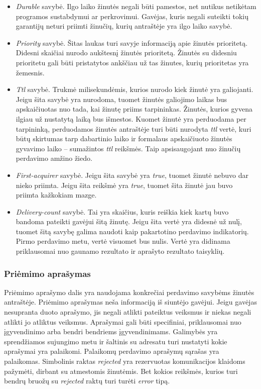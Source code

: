 \documentclass[12pt, a4paper, lithuanian]{article}
\begin{document}
        \begin{itemize}
            \item \textit{Durable} savybė. Ilgo laiko žinutės negali būti pamestos, net nutikus netikėtam programos sustabdymui ar perkrovimui.
            Gavėjas, kuris negali suteikti tokių garantijų neturi priimti žinučių, kurių antraštėje yra ilgo laiko savybė.
            \item \textit{Priority} savybė. Šitas laukas turi savyje informaciją apie žinutės prioritetą. Didesni skaičiai nurodo aukštesnį žinutės prioritetą. Žinutės su didesniu prioritetu gali būti pristatytos ankščiau už tas žinutes, kurių prioritetas yra žemesnis.
            \item \textit{Ttl} savybė. Trukmė milisekundėmis, kurios nurodo kiek žinutė yra galiojanti.
            Jeigu šita savybė yra nurodoma, tuomet žinutės galiojimo laikas bus apskaičiuotas nuo tada, kai žinutę priims tarpininkas.
            Žinutės, kurios gyvena ilgiau už nustatytą laiką bus išmestos.
            Kuomet žinutė yra perduodama per tarpininką, perduodamos žinutės antraštėje turi būti nurodyta \textit{ttl} vertė, kuri būtų skirtumas tarp dabartinio laiko ir formalaus apskaičiuoto žinutės gyvavimo laiko -- sumažintos \textit{ttl} reikšmės. Taip apsisaugojant nuo žinučių perdavimo amžino žiedo.
            \item \textit{First-acquirer} savybė. Jeigu šita savybė yra \textit{true}, tuomet žinutė nebuvo dar nieko priimta. Jeigu šita reikšmė yra \textit{true}, tuomet šita žinutė jau buvo priimta kažkokiam mazge.
            \item \textit{Delivery-count} savybė. Tai yra skaičius, kuris reiškia kiek kartų buvo bandoma pateikti gavėjui šitą žinutę. Jeigu šita vertė yra didesnė už nulį, tuomet šitą savybę galima naudoti kaip pakartotino perdavimo indikatorių. Pirmo perdavimo metu, vertė visuomet bus nulis. 
            Vertė yra didinama priklausomai nuo gaunamo rezultato ir aprašyto rezultato taisyklių.
        \end{itemize}

    \subsubsection{Priėmimo aprašymas}

        Priėmimo aprašymo dalis yra naudojama konkrečiai perdavimo savybėms žinutės antraštėje.
        Priėmimo aprašymas neša informaciją iš siuntėjo gavėjui.
        Jeigu gavėjas nesupranta duoto aprašymo, jis negali atlikti pateiktus veiksmus ir niekas negali atlikti jo atliktus veiksmus.
        Aprašymai gali būti specifiniai, priklausomai nuo įgyvendinimo arba bendri bendriems įgyvendinimams.
        Galimybės yra sprendžiamos sujungimo metu ir šaltinis su adresatu turi nustatyti kokie aprašymai yra palaikomi.
        Palaikomų perdavimo aprašymų sąrašas yra palaikomas.
        Simbolinis raktas \textit{rejected} yra rezervuotas komunikacijos klaidoms pažymėti, dirbant su atmestomis žinutėmis.
        Bet kokios reikšmės, kurios turi bendrų bruožų su \textit{rejected} raktų turi turėti \textit{error} tipą.
\end{document}
